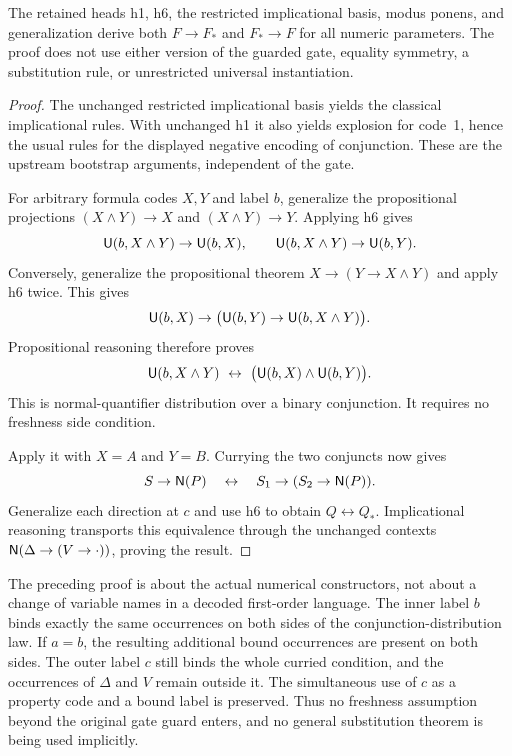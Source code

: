 \begin{proposition}
\label{prop:distributed-gate}
The retained heads h1, h6, the restricted implicational basis, modus
ponens, and generalization derive both $F\to F_*$ and $F_*\to F$ for
all numeric parameters. The proof does not use either version of the
guarded gate, equality symmetry, a substitution rule, or unrestricted
universal instantiation.
\end{proposition}
\begin{proof}
The unchanged restricted implicational basis yields the classical
implicational rules. With unchanged h1 it also yields explosion for
code~1, hence the usual rules for the displayed negative encoding of
conjunction. These are the upstream bootstrap arguments, independent of
the gate.

For arbitrary formula codes $X,Y$ and label $b$, generalize the
propositional projections $(X\wedge Y)\to X$ and
$(X\wedge Y)\to Y$. Applying h6 gives
\[
 \mathsf U(b,X\wedge Y)\to\mathsf U(b,X),\qquad
 \mathsf U(b,X\wedge Y)\to\mathsf U(b,Y).
\]
Conversely, generalize the propositional theorem
$X\to(Y\to X\wedge Y)$ and apply h6 twice. This gives
\[
 \mathsf U(b,X)\to
 \bigl(\mathsf U(b,Y)\to\mathsf U(b,X\wedge Y)\bigr).
\]
Propositional reasoning therefore proves
\[
 \mathsf U(b,X\wedge Y)\ \leftrightarrow\
       \bigl(\mathsf U(b,X)\wedge\mathsf U(b,Y)\bigr).
\]
This is normal-quantifier distribution over a binary conjunction. It
requires no freshness side condition.

Apply it with $X=A$ and $Y=B$. Currying the two conjuncts now gives
\[
 S\to\mathsf N(P)
 \quad\leftrightarrow\quad
 S_1\to(S_2\to\mathsf N(P)).
\]
Generalize each direction at $c$ and use h6 to obtain
$Q\leftrightarrow Q_*$. Implicational reasoning transports this
equivalence through the unchanged contexts
$\mathsf N(\Delta\to(V\to\cdot))$, proving the result.
\end{proof}

The preceding proof is about the actual numerical constructors, not
about a change of variable names in a decoded first-order language.
The inner label $b$ binds exactly the same occurrences on both sides
of the conjunction-distribution law. If $a=b$, the resulting additional
bound occurrences are present on both sides. The outer label $c$ still
binds the whole curried condition, and the occurrences of $\Delta$ and
$V$ remain outside it. The simultaneous use of $c$ as a property code
and a bound label is preserved. Thus no freshness assumption beyond
the original gate guard enters, and no general substitution theorem
is being used implicitly.

